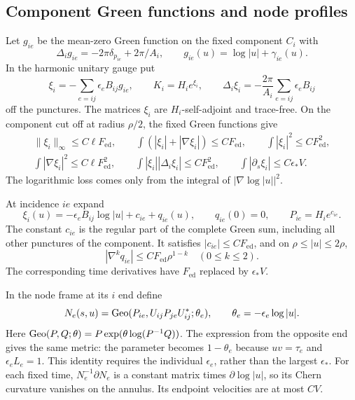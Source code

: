 \subsection{Component Green functions and node profiles}
Let $g_{ie}$ be the mean-zero Green function on the fixed component
$C_i$ with
\begin{equation}\label{eq:green}
 \Delta_i g_{ie}=-2\pi\delta_{p_{ie}}+2\pi/A_i,
 \qquad g_{ie}(u)=\log|u|+\gamma_{ie}(u).
\end{equation}
In the harmonic unitary gauge put
\begin{equation}\label{eq:component-correction}
 \xi_i=-\sum_{e=ij}\epsilon_e B_{ij}g_{ie},
 \qquad K_i=H_i e^{\xi_i},\qquad
 \Delta_i\xi_i=-\frac{2\pi}{A_i}\sum_{e=ij}\epsilon_e B_{ij}
\end{equation}
off the punctures. The matrices $\xi_i$ are $H_i$-self-adjoint
and trace-free. On the component cut off at radius $\rho/2$, the
fixed Green functions give
\begin{equation}\label{eq:green-bounds}
 \begin{gathered}
 \|\xi_i\|_\infty\le C\ell F_{\mathrm{ed}},\qquad
 \int(|\xi_i|+|\nabla\xi_i|)\le CF_{\mathrm{ed}},\qquad
 \int|\xi_i|^2\le CF_{\mathrm{ed}}^2,\\
 \int|\nabla\xi_i|^2\le C\ell F_{\mathrm{ed}}^2,
 \qquad \int|\xi_i||\Delta_i\xi_i|\le CF_{\mathrm{ed}}^2,
 \qquad \int|\partial_s\xi_i|\le C\epsilon_*V.
 \end{gathered}
\end{equation}
The logarithmic loss comes only from the integral of $|\nabla\log|u||^2$.

At incidence $ie$ expand
\begin{equation}\label{eq:regular-split}
 \xi_i(u)=-\epsilon_e B_{ij}\log|u|+c_{ie}+q_{ie}(u),
 \qquad q_{ie}(0)=0,\qquad P_{ie}=H_i e^{c_{ie}}.
\end{equation}
The constant $c_{ie}$ is the regular part of the complete Green sum,
including all other punctures of the component. It satisfies
$|c_{ie}|\le CF_{\mathrm{ed}}$, and on
$\rho\le|u|\le2\rho$,
\begin{equation}\label{eq:regular-bounds}
 |\nabla^kq_{ie}|\le CF_{\mathrm{ed}}\rho^{1-k}
 \quad(0\le k\le2).
\end{equation}
The corresponding time derivatives have $F_{\mathrm{ed}}$ replaced
by $\epsilon_*V$.

In the node frame at its $i$ end define
\begin{equation}\label{eq:node-profile}
 N_e(s,u)=\operatorname{Geo}(P_{ie},U_{ij}P_{je}U_{ij}^*;\theta_e),
 \qquad \theta_e=-\epsilon_e\log|u|.
\end{equation}
Here $\operatorname{Geo}(P,Q;\theta)=P\exp(\theta\log(P^{-1}Q))$.
The expression from the opposite end gives the same metric: the
parameter becomes $1-\theta_e$ because $uv=\tau_e$ and
$\epsilon_e L_e=1$. This identity requires the individual
$\epsilon_e$, rather than the largest $\epsilon_*$. For each
fixed time, $N_e^{-1}\partial N_e$ is a constant matrix times
$\partial\log|u|$, so its Chern curvature vanishes on the annulus.
Its endpoint velocities are at most $CV$.

